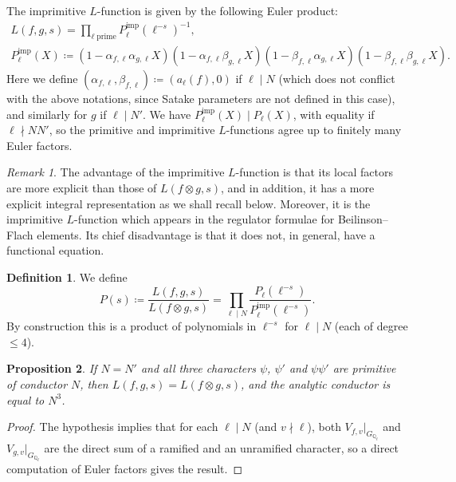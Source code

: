 \documentclass[11pt, a4paper, reqno]{amsart}
\theoremstyle{definition}
\newtheorem{definition}{Definition}[subsection]
\theoremstyle{plain}
\newtheorem{proposition}[definition]{Proposition}
\theoremstyle{remark}
\newtheorem*{remark}{Remark}
\newcommand{\numberset}{\mathbb}
\newcommand{\Q}{\numberset{Q}}
\renewcommand{\le}{\leqslant}
\begin{document}
  The imprimitive $L$-function is given by the following Euler product:
  \begin{gather*}
   L(f,g,s) = \prod_{\ell \; \text{prime}} P_\ell^{\mathrm{imp}}(\ell^{-s})^{-1}, \\
   P_\ell^{\mathrm{imp}}(X) \coloneqq (1-\alpha_{f,\ell}\alpha_{g,\ell}X)(1-\alpha_{f,\ell}\beta_{g,\ell}X)(1-\beta_{f,\ell}\alpha_{g,\ell}X)(1-\beta_{f,\ell}\beta_{g,\ell}X).
  \end{gather*}
  Here we define $(\alpha_{f,\ell},\beta_{f,\ell}) \coloneqq (a_\ell(f), 0)$ if $\ell \mid N$ (which does not conflict with the above notations, since Satake parameters are not defined in this case), and similarly for $g$ if $\ell \mid N'$. We have $P_\ell^{\mathrm{imp}}(X) \mid P_\ell(X)$, with equality if $\ell \nmid N N'$, so the primitive and imprimitive $L$-functions agree up to finitely many Euler factors.

  \begin{remark}
   The advantage of the imprimitive $L$-function is that its local factors are more explicit than those of $L(f \otimes g, s)$, and in addition, it has a more explicit integral representation as we shall recall below. Moreover, it is the imprimitive $L$-function which appears in the regulator formulae for Beilinson--Flach elements. Its chief disadvantage is that it does not, in general, have a functional equation.
  \end{remark}

  \begin{definition}
   We define
   \[ P(s) \coloneqq \frac{L(f, g, s)}{L(f \otimes g, s)} = \prod_{\ell \mid N} \frac{P_\ell(\ell^{-s})}{P_\ell^{\mathrm{imp}}(\ell^{-s})}.\]
   By construction this is a product of polynomials in $\ell^{-s}$ for $\ell \mid N$ (each of degree $\le 4$).
  \end{definition}

  \begin{proposition}\label{prop:imprimitive-eq-prim}
   If $N = N'$ and all three characters $\psi$, $\psi'$ and $\psi\psi'$ are primitive of conductor $N$, then $L(f, g, s) = L(f \otimes g, s)$, and the analytic conductor is equal to $N^3$.
  \end{proposition}

  \begin{proof}
   The hypothesis implies that for each $\ell \mid N$ (and $v \nmid \ell$), both $V_{f, v}|_{G_{\Q_{\ell}}}$ and $V_{g, v}|_{G_{\Q_\ell}}$ are the direct sum of a ramified and an unramified character, so a direct computation of Euler factors gives the result.
  \end{proof}
\end{document}
